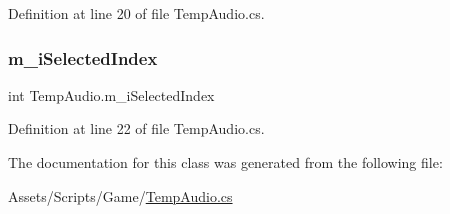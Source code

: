 Definition at line 20 of file Temp\+Audio.\+cs.

\mbox{\label{class_temp_audio_afc0b97092fcd9e36e2c24347ed9ba96a}} 
\subsubsection{\texorpdfstring{m\+\_\+i\+Selected\+Index}{m\_iSelectedIndex}}
{\footnotesize\ttfamily int Temp\+Audio.\+m\+\_\+i\+Selected\+Index}



Definition at line 22 of file Temp\+Audio.\+cs.



The documentation for this class was generated from the following file\+:\begin{DoxyCompactItemize}
\item 
Assets/\+Scripts/\+Game/\mbox{\hyperlink{_temp_audio_8cs}{Temp\+Audio.\+cs}}\end{DoxyCompactItemize}
